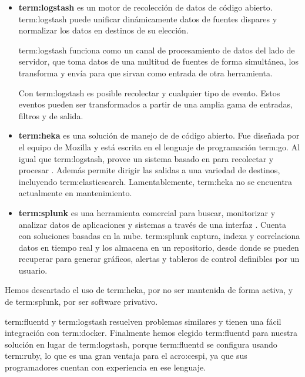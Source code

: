 \begin{itemize}

\item
\textbf{\gls{term:logstash}} es un motor de recolección de datos de código abierto.
\gls{term:logstash} puede unificar dinámicamente datos de fuentes dispares y
normalizar los datos en destinos de su elección.

\gls{term:logstash} funciona como un canal de procesamiento de datos del lado
de servidor, que toma datos de una multitud de fuentes de forma simultánea, los
transforma y envía para que sirvan como entrada de otra herramienta.

Con \gls{term:logstash} es posible recolectar  y cualquier tipo de evento.
Estos eventos pueden ser transformados a partir de una amplia gama de entradas,
filtros y  de salida.

\item
\textbf{\gls{term:heka}} es una solución de manejo de  de código abierto. Fue
diseñada por el equipo de Mozilla y está escrita en el lenguaje de programación
\gls{term:go}. Al igual que \gls{term:logstash}, provee un sistema basado en
 para recolectar y procesar . Además permite dirigir las
salidas a una variedad de destinos, incluyendo \gls{term:elasticsearch}.
Lamentablemente, \gls{term:heka} no se encuentra actualmente en mantenimiento.

\item
\textbf{\gls{term:splunk}} es una herramienta comercial para buscar, monitorizar y
analizar datos de aplicaciones y sistemas a través de una interfaz
. Cuenta con soluciones basadas en la nube. \gls{term:splunk}
captura, indexa y correlaciona datos en tiempo real y los almacena en un
repositorio, desde donde se pueden recuperar para generar gráficos, alertas y
tableros de control definibles por un usuario.

\end{itemize}

Hemos descartado el uso de \gls{term:heka}, por no ser mantenida de forma
activa, y de \gls{term:splunk}, por ser software privativo.

\gls{term:fluentd} y \gls{term:logstash} resuelven problemas similares y tienen
una fácil integración con \gls{term:docker}. Finalmente hemos elegido
\gls{term:fluentd} para nuestra solución en lugar de \gls{term:logstash},
porque \gls{term:fluentd} se configura usando \gls{term:ruby}, lo que es una
gran ventaja para el \gls{acro:cespi}, ya que sus programadores cuentan con
experiencia en ese lenguaje.

